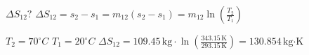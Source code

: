 \( \Delta S_{12}? \)  
\( \Delta S_{12} = s_{2} - s_{1} = m_{12} (s_{2} - s_{1}) = m_{12} \ln \left( \frac{T_{2}}{T_{1}} \right) \)  

\( T_{2} = 70^\circ C \)  
\( T_{1} = 20^\circ C \)  
\( \Delta S_{12} = 109.45 \, \text{kg} \cdot \ln \left( \frac{343.15 \, \text{K}}{293.15 \, \text{K}} \right) = 130.854 \, \text{kg·K} \)